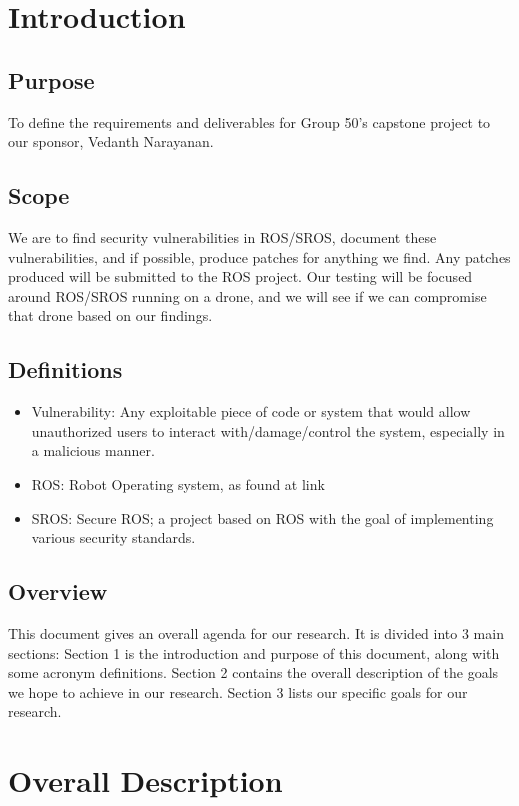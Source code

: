 \documentclass{scrreprt}
\begin{document}
\chapter{Introduction}

\section{Purpose}
To define the requirements and deliverables for Group 50's capstone project to our sponsor, Vedanth Narayanan.

\section{Scope}
We are to find security vulnerabilities in ROS/SROS, document these vulnerabilities, and if possible, produce patches for anything we find. Any patches produced will be submitted to the ROS project. Our testing will be focused around ROS/SROS running on a drone, and we will see if we can compromise that drone based on our findings.

\section{Definitions}
\begin{itemize}
  \item Vulnerability: Any exploitable piece of code or system that would allow unauthorized users to interact with/damage/control the system, especially in a malicious manner.
  \item ROS: Robot Operating system, as found at link
  \item SROS: Secure ROS; a project based on ROS with the goal of implementing various security standards.
\end{itemize}

\section{Overview}
This document gives an overall agenda for our research. It is divided into 3 main sections:
Section 1 is the introduction and purpose of this document, along with some acronym definitions.
Section 2 contains the overall description of the goals we hope to achieve in our research.
Section 3 lists our specific goals for our research.


\chapter{Overall Description}
\end{document}
